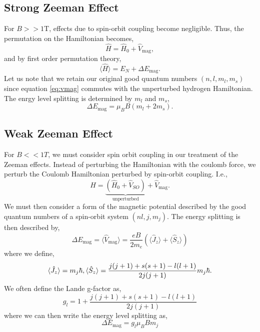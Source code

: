 \documentclass{book}
\begin{document}
\subsection{Strong Zeeman Effect}
For $B >> 1$T, effects due to spin-orbit coupling become negligible. Thus, the permutation on the Hamiltonian becomes,
\begin{equation}
	\hat{H} = \hat{H}_0 + \hat{V}_{\text{mag}},
\end{equation}
and by first order permutation theory,
\begin{equation}
	\langle \hat{H} \rangle = E_N + \Delta E_{\text{mag}}.
\end{equation}
Let us note that we retain our original good quantum numbers $(n,l,m_l,m_s)$ since equation \eqref{eq:vmag} commutes with the unperturbed hydrogen Hamiltonian. The enrgy level splitting is determined by $m_l$ and $m_s$,
\begin{equation}
	\Delta E_{\text{mag}} = \mu_B B(m_l + 2m_s).
\end{equation}
\subsection{Weak Zeeman Effect}
For $B << 1T$, we must consider spin orbit coupling in our treatment of the Zeeman effects. Instead of perturbing the Hamiltonian with the coulomb force, we perturb the Coulomb Hamiltonian perturbed by spin-orbit coupling. I.e.,
\begin{equation}
	\hat{H} = \underbrace{\left(\hat{H}_0 + \hat{V}_{SO}\right)}_{\text{unperturbed}} + \hat{V}_{\text{mag}}.
\end{equation}
We must then consider a form of the magnetic potential described by the good quantum numbers of a spin-orbit system $(n l, j, m_j)$. The energy splitting is then described by,
\begin{equation}
	\Delta E_{\text{mag}} = \langle \hat{V}_{\text{mag}}\rangle = \frac{eB}{2m_e}\left(\langle \hat{J}_z\rangle + \langle \hat{S}_z\rangle\right)
\end{equation}
where we define,
\begin{equation}
	\langle \hat{J}_z \rangle = m_j \hbar, \\
	\langle \hat{S}_z \rangle = \frac{j(j+1) + s(s+1) - l(l+1)}{2j(j+1)}m_j\hbar.
\end{equation}
We often define the Lande g-factor as,
\begin{equation}
	g_l = 1 + \frac{j(j+1) + s(s+1) - l(l+1)}{2j(j+1)}
\end{equation}
where we can then write  the energy level splitting as,
\begin{equation}
	\Delta E _{\text{mag}} = g_l \mu_B Bm_j
\end{equation}
\end{document}
